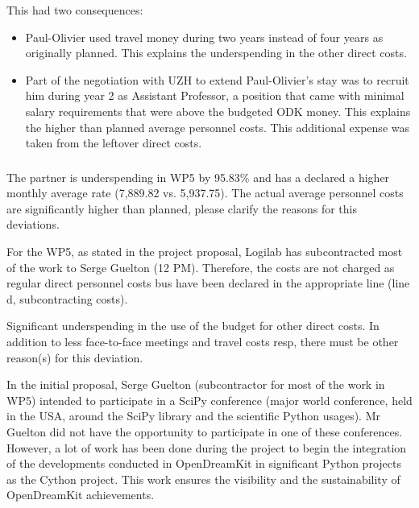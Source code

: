 This had two consequences:
\begin{itemize}
\item Paul-Olivier used travel money during two years instead of four
  years as originally planned. This explains the underspending in the
  other direct costs.
\item Part of the negotiation with UZH to extend Paul-Olivier's stay
  was to recruit him during year 2 as Assistant Professor, a position
  that came with minimal salary requirements that were above the
  budgeted ODK money. This explains the higher than planned average
  personnel costs. This additional expense was taken from the leftover
  direct costs.
\end{itemize}

\subsubsection{}
\begin{EUcomment}
  The partner is underspending in WP5 by 95.83\% and has a declared a
  higher monthly average rate (7,889.82 vs. 5,937.75). The actual
  average personnel costs are significantly higher than planned,
  please clarify the reasons for this deviations.
\end{EUcomment}
For the WP5, as stated in the project proposal, Logilab has subcontracted
most of the work to Serge Guelton (12 PM). Therefore, the costs are not
charged as regular direct personnel costs bus have been declared in the
appropriate line (line d, subcontracting costs).

\begin{EUcomment}
  Significant underspending in the use of the budget for other direct
  costs. In addition to less face-to-face meetings and travel costs
  resp, there must be other reason(s) for this deviation.
\end{EUcomment}
In the initial proposal, Serge Guelton (subcontractor for most of the
work in WP5) intended to participate in a SciPy conference (major world
conference, held in the USA, around the SciPy library and the scientific
Python usages). Mr Guelton did not have the opportunity to participate
in one of these conferences. However, a lot of work has been done during
the project to begin the integration of the developments conducted in
OpenDreamKit in significant Python projects as the Cython project.
This work ensures the visibility and the sustainability of OpenDreamKit
achievements.

